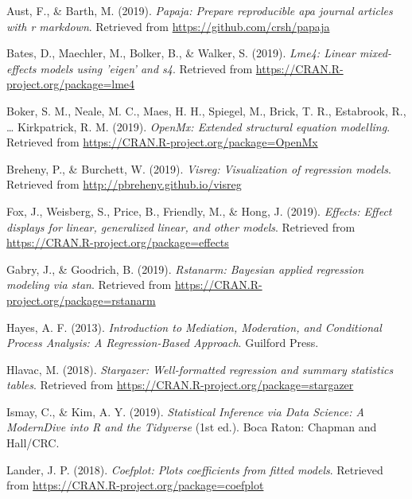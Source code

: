 \documentclass[doc,floatsintext]{apa6}
\begin{document}
\begingroup
\setlength{\parindent}{-0.5in} \setlength{\leftskip}{0.5in}

\hypertarget{refs}{}
\hypertarget{ref-R-papaja}{}
Aust, F., \& Barth, M. (2019). \emph{Papaja: Prepare reproducible apa
journal articles with r markdown}. Retrieved from
\url{https://github.com/crsh/papaja}

\hypertarget{ref-R-lme4}{}
Bates, D., Maechler, M., Bolker, B., \& Walker, S. (2019). \emph{Lme4:
Linear mixed-effects models using 'eigen' and s4}. Retrieved from
\url{https://CRAN.R-project.org/package=lme4}

\hypertarget{ref-R-OpenMx}{}
Boker, S. M., Neale, M. C., Maes, H. H., Spiegel, M., Brick, T. R.,
Estabrook, R., \ldots{} Kirkpatrick, R. M. (2019). \emph{OpenMx:
Extended structural equation modelling}. Retrieved from
\url{https://CRAN.R-project.org/package=OpenMx}

\hypertarget{ref-R-visreg}{}
Breheny, P., \& Burchett, W. (2019). \emph{Visreg: Visualization of
regression models}. Retrieved from
\url{http://pbreheny.github.io/visreg}

\hypertarget{ref-R-effects}{}
Fox, J., Weisberg, S., Price, B., Friendly, M., \& Hong, J. (2019).
\emph{Effects: Effect displays for linear, generalized linear, and other
models}. Retrieved from \url{https://CRAN.R-project.org/package=effects}

\hypertarget{ref-R-rstanarm}{}
Gabry, J., \& Goodrich, B. (2019). \emph{Rstanarm: Bayesian applied
regression modeling via stan}. Retrieved from
\url{https://CRAN.R-project.org/package=rstanarm}

\hypertarget{ref-HayesIntroductionMediationModeration2013}{}
Hayes, A. F. (2013). \emph{Introduction to Mediation, Moderation, and
Conditional Process Analysis: A Regression-Based Approach}. Guilford
Press.

\hypertarget{ref-R-stargazer}{}
Hlavac, M. (2018). \emph{Stargazer: Well-formatted regression and
summary statistics tables}. Retrieved from
\url{https://CRAN.R-project.org/package=stargazer}

\hypertarget{ref-IsmayIntroductionStatisticalData}{}
Ismay, C., \& Kim, A. Y. (2019). \emph{Statistical Inference via Data
Science: A ModernDive into R and the Tidyverse} (1st ed.). Boca Raton:
Chapman and Hall/CRC.

\hypertarget{ref-R-coefplot}{}
Lander, J. P. (2018). \emph{Coefplot: Plots coefficients from fitted
models}. Retrieved from
\url{https://CRAN.R-project.org/package=coefplot}
\end{document}
